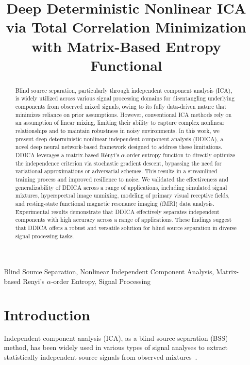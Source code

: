 \documentclass{article}
\title{Deep Deterministic Nonlinear ICA \\ via Total Correlation Minimization with Matrix-Based Entropy Functional}
\begin{document}
\maketitle
\begin{abstract}
Blind source separation, particularly through independent component analysis (ICA), is widely utilized across various signal processing domains for disentangling underlying components from observed mixed signals, owing to its fully data-driven nature that minimizes reliance on prior assumptions. However, conventional ICA methods rely on an assumption of linear mixing, limiting their ability to capture complex nonlinear relationships and to maintain robustness in noisy environments. In this work, we present deep deterministic nonlinear independent component analysis (DDICA), a novel deep neural network-based framework designed to address these limitations. DDICA leverages a matrix-based Rényi’s $\alpha$-order entropy function to directly optimize the independence criterion via stochastic gradient descent, bypassing the need for variational approximations or adversarial schemes. This results in a streamlined training process and improved resilience to noise. We validated the effectiveness and generalizability of DDICA across a range of applications, including simulated signal mixtures, hyperspectral image unmixing, modeling of primary visual receptive fields, and resting-state functional magnetic resonance imaging (fMRI) data analysis. Experimental results demonstrate that DDICA effectively separates independent components with high accuracy across a range of applications. These findings suggest that DDICA offers a robust and versatile solution for blind source separation in diverse signal processing tasks.
\end{abstract}

\begin{keywords}
Blind Source Separation, Nonlinear Independent Component Analysis, Matrix-based Renyi's $\alpha$-order Entropy, Signal Processing
\end{keywords}

\section{Introduction}
\label{sec:intro}
\hspace{1.2em} Independent component analysis (ICA), as a blind source separation (BSS) method, has been widely used in various types of signal analyses to extract statistically independent source signals from observed mixtures~\cite{comon10,hyvarinen1999fast,bell1995information}. 
\end{document}
